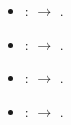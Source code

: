 \begin{itemize}
  \item {}:  $\rightarrow$ .
  \item {}:  $\rightarrow$ .
  \item {}:  $\rightarrow$ .
  \item {}:  $\rightarrow$ .
\end{itemize}
